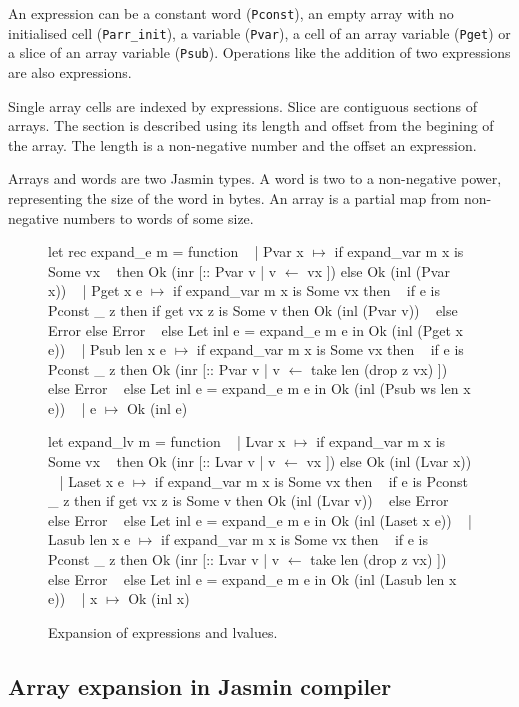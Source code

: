 \documentclass{article}
\begin{document}
An expression can be a constant word (\texttt{Pconst}), an empty array with no
initialised cell (\texttt{Parr\_init}), a variable (\texttt{Pvar}), a cell of an
array variable (\texttt{Pget}) or a slice of an array variable (\texttt{Psub}).
Operations like the addition of two expressions are also expressions.

Single array cells are indexed by expressions. Slice are contiguous sections of
arrays. The section is described using its length and offset from the begining
of the array. The length is a non-negative number and the offset an expression.

\smallskip

Arrays and words are two Jasmin types. A word is two to a non-negative power,
representing the size of the word in bytes. An array is a partial map from
non-negative numbers to words of some size.

\begin{figure}[t]
\obeylines\obeyspaces\ttfamily%
let rec expand\_e m = function
~ | Pvar x \(\mapsto\) if expand\_var m x is Some vx
~   then Ok (inr [:: Pvar v | v \(\leftarrow\) vx ]) else Ok (inl (Pvar x))
~ | Pget x e \(\mapsto\) if expand\_var m x is Some vx then
~     if e is Pconst \_ z then if get vx z is Some v then Ok (inl (Pvar v))
~     else Error else Error
~   else Let inl e = expand\_e m e in Ok (inl (Pget x e))
~ | Psub len x e \(\mapsto\) if expand\_var m x is Some vx then
~     if e is Pconst \_ z then Ok (inr [:: Pvar v | v \(\leftarrow\) take len (drop z vx) ])
~     else Error
~   else Let inl e = expand\_e m e in Ok (inl (Psub ws len x e))
~ | e \(\mapsto\) Ok (inl e)

let expand\_lv m = function
~ | Lvar x \(\mapsto\) if expand\_var m x is Some vx
~   then Ok (inr [:: Lvar v | v \(\leftarrow\) vx ]) else Ok (inl (Lvar x))
~ | Laset x e \(\mapsto\) if expand\_var m x is Some vx then
~     if e is Pconst \_ z then if get vx z is Some v then Ok (inl (Lvar v))
~     else Error else Error
~   else Let inl e = expand\_e m e in Ok (inl (Laset x e))
~ | Lasub len x e \(\mapsto\) if expand\_var m x is Some vx then
~     if e is Pconst \_ z then Ok (inr [:: Lvar v | v \(\leftarrow\) take len (drop z vx) ])
~     else Error
~   else Let inl e = expand\_e m e in Ok (inl (Lasub len x e))
~ | x \(\mapsto\) Ok (inl x)
\normalfont%
\caption{Expansion of expressions and lvalues.}\label{fig:fullexp}
\end{figure}

\subsection{Array expansion in Jasmin compiler}
\end{document}
